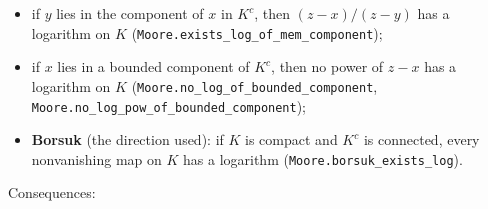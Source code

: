 \documentclass[11pt]{article}
\newcommand{\lean}[1]{\texttt{#1}}
\begin{document}
\begin{itemize}
  \item if $y$ lies in the component of $x$ in $K^c$, then $(z - x)/(z - y)$ has a logarithm on $K$ (\lean{Moore.\hspace{0pt}exists\_\hspace{0pt}log\_\hspace{0pt}of\_\hspace{0pt}mem\_\hspace{0pt}component});
  \item if $x$ lies in a bounded component of $K^c$, then no power of $z - x$ has a logarithm on $K$ (\lean{Moore.\hspace{0pt}no\_\hspace{0pt}log\_\hspace{0pt}of\_\hspace{0pt}bounded\_\hspace{0pt}component}, \lean{Moore.\hspace{0pt}no\_\hspace{0pt}log\_\hspace{0pt}pow\_\hspace{0pt}of\_\hspace{0pt}bounded\_\hspace{0pt}component});
  \item \textbf{Borsuk} (the direction used): if $K$ is compact and $K^c$ is connected, every nonvanishing map on $K$ has a logarithm (\lean{Moore.\hspace{0pt}borsuk\_\hspace{0pt}exists\_\hspace{0pt}log}).
\end{itemize}

Consequences:
\end{document}
